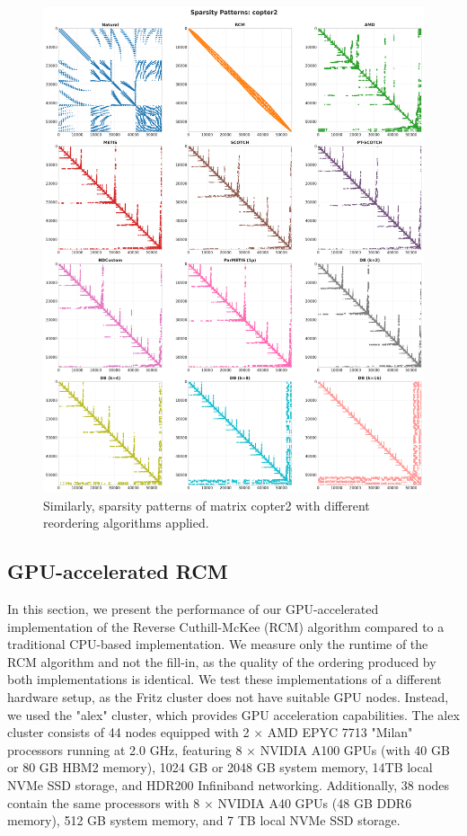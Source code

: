 \begin{figure}[h]
\centering
\includegraphics[width=\textwidth]{fig/res/copter2_sparsity_patterns.png}
\caption{Similarly, sparsity patterns of matrix copter2 with different reordering algorithms applied.}
\label{fig:copter2-sparsity-patterns}
\end{figure}

\FloatBarrier

\subsection{GPU-accelerated RCM}

In this section, we present the performance of our GPU-accelerated implementation of the Reverse Cuthill-McKee (RCM) algorithm compared to a traditional CPU-based implementation. We measure only the runtime of the RCM algorithm and not the fill-in, as the quality of the ordering produced by both implementations is identical. We test these implementations of a different hardware setup, as the Fritz cluster does not have suitable GPU nodes. Instead, we used the "alex" cluster, which provides GPU acceleration capabilities. The alex cluster consists of 44 nodes equipped with 2 × AMD EPYC 7713 "Milan" processors running at 2.0 GHz, featuring 8 × NVIDIA A100 GPUs (with 40 GB or 80 GB HBM2 memory), 1024 GB or 2048 GB system memory, 14TB local NVMe SSD storage, and HDR200 Infiniband networking. Additionally, 38 nodes contain the same processors with 8 × NVIDIA A40 GPUs (48 GB DDR6 memory), 512 GB system memory, and 7 TB local NVMe SSD storage.


